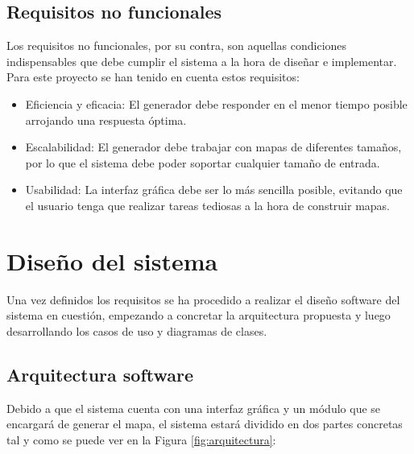 \subsection{Requisitos no funcionales}

Los requisitos no funcionales, por su contra, son aquellas condiciones indispensables que debe cumplir el sistema a la hora de diseñar e implementar. Para este proyecto se han tenido en cuenta estos requisitos:

\begin{itemize}
	\item Eficiencia y eficacia: El generador debe responder en el menor tiempo posible arrojando una respuesta óptima.
	\item Escalabilidad: El generador debe trabajar con mapas de diferentes tamaños, por lo que el sistema debe poder soportar cualquier tamaño de entrada.
	\item Usabilidad: La interfaz gráfica debe ser lo más sencilla posible, evitando que el usuario tenga que realizar tareas tediosas a la hora de construir mapas.
\end{itemize}

\section{Diseño del sistema}

Una vez definidos los requisitos se ha procedido a realizar el diseño software del sistema en cuestión, empezando a concretar la arquitectura propuesta y luego desarrollando los casos de uso y diagramas de clases.

\subsection{Arquitectura software}
\label{subsec:arquitectura}

Debido a que el sistema cuenta con una interfaz gráfica y un módulo que se encargará de generar el mapa, el sistema estará dividido en dos partes concretas tal y como se puede ver en la Figura \ref{fig:arquitectura}:

